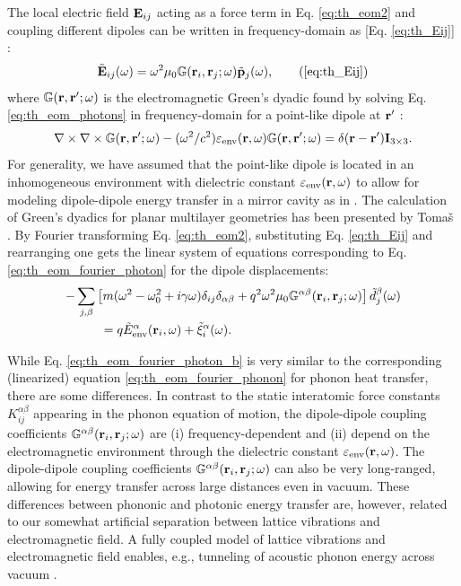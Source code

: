 The local electric field $\mathbf{E}_{ij}$ acting as a force term in Eq. \eqref{eq:th_eom2} and coupling different dipoles can be written in frequency-domain as [Eq. \eqref{eq:th_Eij}] \cite{novotny,rosa11}:
\begin{equation}
\tilde \bE_{ij}(\omega) = \omega^2 \mu_0 \mathbb{G}(\br_i,\br_j;\omega) \tilde{\bb{p}}_j(\omega), \tag{\ref{eq:th_Eij}}
\end{equation}
where $\mathbb{G}(\mathbf{r},\mathbf{r}';\omega)$ is the electromagnetic Green's dyadic found by solving Eq. \eqref{eq:th_eom_photons} in frequency-domain for a point-like dipole at $\mathbf{r}'$ \cite{novotny}:
 \begin{equation}
 \nabla \times \nabla \times \mathbb{G}(\mathbf{r},\mathbf{r}';\omega) - (\omega^2/c^2) \varepsilon_{\textrm{env}}(\mathbf{r},\omega)\mathbb{G}(\mathbf{r},\mathbf{r}';\omega)  =  \delta(\mathbf{r}-\mathbf{r}')\mathbf{I}_{3 \times 3}. \label{eq:intro_gemdef}
\end{equation}
For generality, we have assumed that the point-like dipole is located in an inhomogeneous environment with dielectric constant $\varepsilon_{\textrm{env}}(\mathbf{r},\omega)$ to allow for modeling dipole-dipole energy transfer in a mirror cavity as in . The calculation of Green's dyadics for planar multilayer geometries has been presented by Toma\v{s} \cite{tomas95}. By Fourier transforming Eq. \eqref{eq:th_eom2}, substituting Eq. \eqref{eq:th_Eij} and rearranging one gets the linear system of equations corresponding to Eq. \eqref{eq:th_eom_fourier_photon} for the dipole displacements:
\begin{alignat}{2}
 - & \sum_{j,\beta} \left[m(\omega^2-\omega_0^2+i\gamma\omega) \delta_{ij}\delta_{\alpha\beta} +q^2 \omega^2 \mu_0 \mathbb{G}^{\alpha\beta}(\mathbf{r}_i,\mathbf{r}_j;\omega) \right]\tilde{d}_j^{\beta}(\omega) \notag \\
  & \qquad = q\tilde{E}_{\textrm{env}}^{\alpha}(\mathbf{r}_i,\omega) + \tilde{\xi}^{\alpha}_i(\omega). \label{eq:th_eom_fourier_photon_b}
\end{alignat}

While Eq. \eqref{eq:th_eom_fourier_photon_b} is very similar to the corresponding (linearized) equation \eqref{eq:th_eom_fourier_phonon} for phonon heat transfer, there are some differences. In contrast to the static interatomic force constants $K_{ij}^{\alpha\beta}$ appearing in the phonon equation of motion, the dipole-dipole coupling coefficients $\mathbb{G}^{\alpha\beta}(\mathbf{r}_i,\mathbf{r}_j;\omega)$ are (i) frequency-dependent and (ii) depend on the electromagnetic environment through the dielectric constant $\varepsilon_{\textrm{env}}(\mathbf{r},\omega)$. The dipole-dipole coupling coefficients $\mathbb{G}^{\alpha\beta}(\mathbf{r}_i,\mathbf{r}_j;\omega)$ can also be very long-ranged, allowing for energy transfer across large distances even in vacuum. These differences between phononic and photonic energy transfer are, however, related to our somewhat artificial separation between lattice vibrations and electromagnetic field. A fully coupled model of lattice vibrations and electromagnetic field \cite{chiloyan15} enables, e.g., tunneling of acoustic phonon energy across vacuum \cite{prunnila10}.

